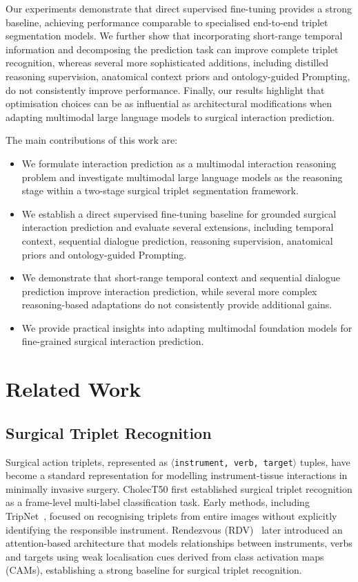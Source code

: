 \documentclass[11pt]{article}
\newcommand{\ivttriplet}{\texttt{$\langle$instrument, verb, target$\rangle$}\xspace}
\begin{document}
Our experiments demonstrate that direct supervised fine-tuning provides a strong baseline, achieving performance comparable to specialised end-to-end triplet segmentation models. We further show that incorporating short-range temporal information and decomposing the prediction task can improve complete triplet recognition, whereas several more sophisticated additions, including distilled reasoning supervision, anatomical context priors and ontology-guided Prompting, do not consistently improve performance. Finally, our results highlight that optimisation choices can be as influential as architectural modifications when adapting multimodal large language models to surgical interaction prediction.

The main contributions of this work are:
\begin{itemize}
    \item We formulate interaction prediction as a multimodal interaction reasoning problem and investigate multimodal large language models as the reasoning stage within a two-stage surgical triplet segmentation framework.
    
    \item We establish a direct supervised fine-tuning baseline for grounded surgical interaction prediction and evaluate several extensions, including temporal context, sequential dialogue prediction, reasoning supervision, anatomical priors and ontology-guided Prompting.
    
    \item We demonstrate that short-range temporal context and sequential dialogue prediction improve interaction prediction, while several more complex reasoning-based adaptations do not consistently provide additional gains.
    
    \item We provide practical insights into adapting multimodal foundation models for fine-grained surgical interaction prediction.
\end{itemize}

\section{Related Work}

\subsection{Surgical Triplet Recognition}

Surgical action triplets, represented as \ivttriplet tuples, have become a standard representation for modelling instrument-tissue interactions in minimally invasive surgery. CholecT50 \cite{nwoye2022rendezvous} first established surgical triplet recognition as a frame-level multi-label classification task. Early methods, including TripNet~\cite{nwoye2020recognition}, focused on recognising triplets from entire images without explicitly identifying the responsible instrument. Rendezvous (RDV)~\cite{nwoye2022rendezvous} later introduced an attention-based architecture that models relationships between instruments, verbs and targets using weak localisation cues derived from class activation maps (CAMs), establishing a strong baseline for surgical triplet recognition.
\end{document}
